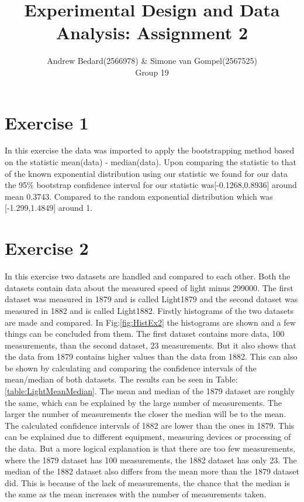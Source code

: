 \documentclass{article}
\title{Experimental Design and Data Analysis: Assignment 2}
\author{Andrew Bedard(2566978) \& Simone van Gompel(2567525) \\ Group 19}
\begin{document}
  \maketitle

  \section{Exercise 1}
    In this exercise the data was imported to apply the bootstrapping method based on the statistic mean(data) - median(data). Upon comparing the statistic to that of the known exponential distribution using our statistic we found for our data the 95\% bootstrap confidence interval for our statistic was[-0.1268,0.8936] around mean 0.3743. Compared to the random exponential distribution which was [-1.299,1.4849] around 1.

  \section{Exercise 2}
    In this exercise two datasets are handled and compared to each other.
    Both the datasets contain data about the measured speed of light minus 299000.
    The first dataset was measured in 1879 and is called Light1879
    and the second dataset was measured in 1882 and is called Light1882.
    Firstly histograms of the two datasets are made and compared.
    In Fig:\ref{fig:HistEx2} the histograms are shown and a few things can be concluded from them.
    The first dataset contains more data, 100 measurements, than the second dataset, 23 measurements.
    But it also shows that the data from 1879 contains higher values than the data from 1882.
    This can also be shown by calculating and comparing the confidence intervals of the mean/median of both datasets.
    The results can be seen in Table:\ref{table:LightMeanMedian}.
    The mean and median of the 1879 dataset are roughly the same,
    which can be explained by the large number of measurements.
    The larger the number of measurements the closer the median will be to the mean.
    The calculated confidence intervals of 1882 are lower than the ones in 1879.
    This can be explained due to different equipment, measuring devices or processing of the data.
    But a more logical explanation is that there are too few measurements,
    where the 1879 dataset has 100 measurements, the 1882 dataset has only 23.
    The median of the 1882 dataset also differs from the mean more than the 1879 dataset did.
    This is because of the lack of measurements,
    the chance that the median is the same as the mean increases with the number of measurements taken.
\end{document}
